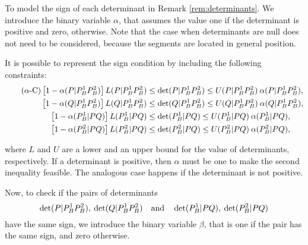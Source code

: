 \documentclass[a4paper]{elsarticle}
\begin{document}
	\newcommand{\LS}[3]{L(#1|#2#3)}
	\newcommand{\US}[3]{U(#1|#2#3)}
	\newcommand{\alphamas}[3]{\alpha(#1|#2#3)}
	\newcommand{\alphamenos}[3]{\alpha^{-}(#1|#2#3)}
	\newcommand{\alphapunto}[3]{\alpha^{\cdotp}(#1|#2#3)}
	
	To model the sign of each determinant in Remark \ref{rem:determinants}. We introduce the binary variable $\alpha$, that assumes the value one if the determinant is positive and zero, otherwise. Note that the case when determinants are null does not need to be considered, because the segments are located in general position.
	
	It is possible to represent the sign condition by including the following constraints:
	\begin{align*}\tag{$\alpha$-C}\label{eq:alphaC}
		\left[1-\alphamas{P}{P_B^1}{P_B^2}\right]\LS{P}{P_B^1}{P_B^2}&\leq\determinant{P}{P_B^1}{P_B^2}\leq \US{P}{P_B^1}{P_B^2}\:\alphamas{P}{P_B^1}{P_B^2},\\
		\left[1-\alphamas{Q}{P_B^1}{P_B^2}\right]\LS{Q}{P_B^1}{P_B^2}&\leq\determinant{Q}{P_B^1}{P_B^2}\leq \US{Q}{P_B^1}{P_B^2}\:\alphamas{Q}{P_B^1}{P_B^2},\\
		\left[1-\alphamas{P_B^1}{P}{Q}\right]\LS{P_B^1}{P}{Q}&\leq\determinant{P_B^1}{P}{Q}\leq \US{P_B^1}{P}{Q}\:\alphamas{P_B^1}{P}{Q},\\		\left[1-\alphamas{P_B^2}{P}{Q}\right]\LS{P_B^2}{P}{Q}&\leq\determinant{P_B^2}{P}{Q}\leq \US{P_B^2}{P}{Q}\:\alphamas{P_B^2}{P}{Q},
	\end{align*}
	
	\noindent where $L$ and $U$ are a lower and an upper bound for the value of determinants, respectively. If a determinant is positive, then $\alpha$ must be one to make the second inequality feasible. The analogous case happens if the determinant is not positive.
	
	\newcommand{\betamas}[4]{\beta(#1#2|#3#4)}
	
	Now, to check if the pairs of determinants 
	$$\det({P|P_B^1P_B^2}),\: \det({Q|P_B^1P_B^2})\quad \text{and} \quad \det({P_B^1|PQ}),\:	 \det({P_B^2|PQ})$$ 
	have the same sign, we introduce the binary variable $\beta$, that is one if the pair has the same sign, and zero otherwise.
	
	\newcommand{\gammaprod}[4]{\gamma(#1#2|#3#4)}
	
\end{document}
